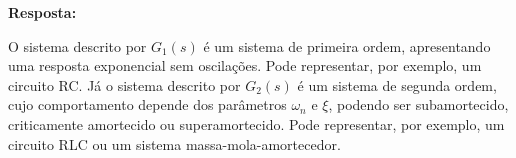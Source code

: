 \documentclass[12pt,a4paper]{article}
\begin{document}
\begin{enumerate}
		\textbf{Resposta:}
		
		O sistema descrito por $G_1(s)$ é um sistema de primeira ordem, apresentando uma resposta exponencial sem oscilações. Pode representar, por exemplo, um circuito RC. Já o sistema descrito por $G_2(s)$ é um sistema de segunda ordem, cujo comportamento depende dos parâmetros \(\omega_n\) e \(\xi\), podendo ser subamortecido, criticamente amortecido ou superamortecido. Pode representar, por exemplo, um circuito RLC ou um sistema massa-mola-amortecedor.

	\end{enumerate}
	
\end{document}
